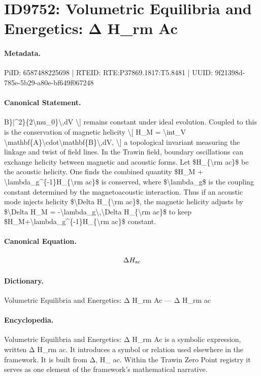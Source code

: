 \section*{ID9752: Volumetric Equilibria and Energetics: Δ H\_rm Ac}
\paragraph{Metadata.}
PiID: 6587488225698 | RTEID: RTE:P37869.1817:T5.8481 | UUID: 9f21398d-785e-5b29-a80e-bf649f067248

\paragraph{Canonical Statement.}
B\}|\textasciicircum{}2\}\{2\textbackslash{}mu\_0\}\textbackslash{},dV \textbackslash{}] remains constant under ideal evolution. Coupled to this is the conservation of magnetic helicity \textbackslash{}[ H\_M = \textbackslash{}int\_V \textbackslash{}mathbf\{A\}\textbackslash{}cdot\textbackslash{}mathbf\{B\}\textbackslash{},dV, \textbackslash{}] a topological invariant measuring the linkage and twist of field lines. In the Trawin field, boundary oscillations can exchange helicity between magnetic and acoustic forms. Let \$H\_\{\textbackslash{}rm ac\}\$ be the acoustic helicity. One finds the combined quantity \$H\_M + \textbackslash{}lambda\_g\textasciicircum{}\{-1\}H\_\{\textbackslash{}rm ac\}\$ is conserved, where \$\textbackslash{}lambda\_g\$ is the coupling constant determined by the magnetoacoustic interaction. Thus if an acoustic mode injects helicity \$\textbackslash{}Delta H\_\{\textbackslash{}rm ac\}\$, the magnetic helicity adjusts by \$\textbackslash{}Delta H\_M = -\textbackslash{}lambda\_g\textbackslash{},\textbackslash{}Delta H\_\{\textbackslash{}rm ac\}\$ to keep \$H\_M+\textbackslash{}lambda\_g\textasciicircum{}\{-1\}H\_\{\textbackslash{}rm ac\}\$ constant.

\paragraph{Canonical Equation.}
\[
\Delta H_{\rm ac}
\]

\paragraph{Dictionary.}
Volumetric Equilibria and Energetics: Δ H\_rm Ac — Δ H\_rm ac

\paragraph{Encyclopedia.}
Volumetric Equilibria and Energetics: Δ H\_rm Ac is a symbolic expression, written Δ H\_rm ac. It introduces a symbol or relation used elsewhere in the framework. It is built from Δ, H\_ ac. Within the Trawin Zero Point registry it serves as one element of the framework's mathematical narrative.
